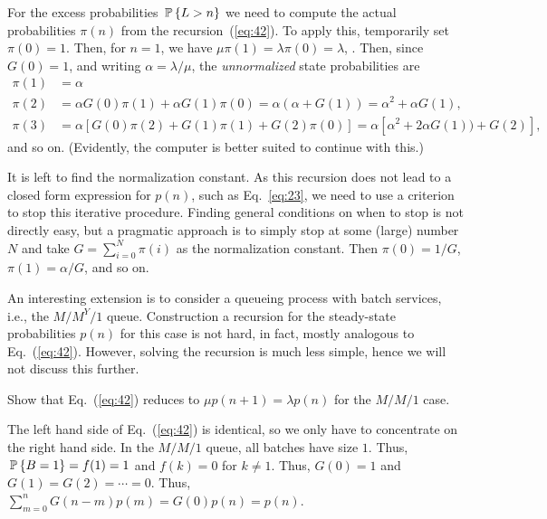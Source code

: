 For the excess probabilities $\P{L>n}$ we need to compute the actual
probabilities $\pi(n)$ from the recursion~(\ref{eq:42}). To apply
this, temporarily set $\pi(0)=1$. Then, for $n=1$, we have
$\mu \pi(1) = \lambda \pi(0)=\lambda$, . Then,
since $G(0)=1$, and writing $\alpha = \lambda/\mu$, the
\emph{unnormalized} state probabilities are
\begin{equation*}
  \begin{split}
  \pi(1) &= \alpha \\
  \pi(2) &= \alpha G(0) \pi(1) + \alpha G(1) \pi(0) =\alpha(\alpha+ G(1)) = \alpha^2 + \alpha G(1), \\
  \pi(3) 
&= \alpha[G(0) \pi(2) + G(1) \pi(1) + G(2) \pi(0)]  = \alpha[ \alpha^2 + 2 \alpha G(1)) + G(2)],
  \end{split}
\end{equation*}
and so on. (Evidently, the computer is better suited to continue with
this.)

It is left to find the normalization constant.  As this recursion does
not lead to a closed form expression for $p(n)$, such as
Eq.~\eqref{eq:23}, we need to use a criterion to stop this iterative
procedure. Finding general conditions on when to stop is not directly
easy, but a pragmatic approach is to simply stop at some (large)
number $N$ and take $G=\sum_{i=0}^N \pi(i)$ as the normalization
constant. Then $\pi(0)=1/G$, $\pi(1)=\alpha/G$, and so on.

\begin{remark}
An interesting extension is to consider a queueing process with batch
services, i.e., the $M/M^Y/1$ queue. Construction a recursion for the
steady-state probabilities $p(n)$ for this case is not hard, in fact,
mostly analogous to Eq.~(\ref{eq:42}).  However, solving the recursion
is much less simple, hence we will not discuss this further.
\end{remark}


\begin{question}
  Show that Eq.~(\ref{eq:42}) reduces to $\mu p(n+1)=\lambda p(n)$ for the $M/M/1$ case.
  \begin{solution}
    The left hand side of Eq.~(\ref{eq:42}) is identical, so we only
    have to concentrate on the right hand side. In the $M/M/1$ queue,
    all batches have size $1$. Thus, $\P{B=1} = f(1)=1$ and $f(k)=0$
    for $k\neq 1$. Thus, $G(0)=1$ and $G(1)=G(2)=\cdots = 0$. Thus,
    $\sum_{m=0}^n G(n-m) p(m) = G(0)p(n)=p(n)$.
  \end{solution}
\end{question}

